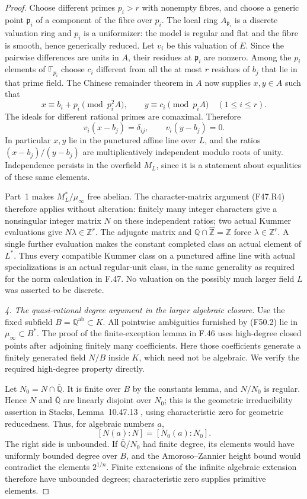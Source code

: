 \begin{proof}
Choose different primes $p_i>r$ with nonempty fibres, and choose
a generic point $\mathfrak p_i$ of a component of the fibre over
$p_i$. The local ring $A_{\mathfrak p_i}$ is a discrete valuation
ring and $p_i$ is a uniformizer: the model is regular and flat and
the fibre is smooth, hence generically reduced. Let $v_i$ be this
valuation of $E$. Since the pairwise differences are units in
$A$, their residues at $\mathfrak p_i$ are nonzero. Among the
$p_i$ elements of $\mathbb F_{p_i}$ choose $c_i$ different from
all the at most $r$ residues of $b_j$ that lie in that prime field.
The Chinese remainder theorem in $A$ now supplies $x,y\in A$
such that
\[
 x\equiv b_i+p_i\pmod{p_i^2A},\qquad
 y\equiv c_i\pmod{p_iA}\quad(1\le i\le r).
\]
The ideals for different rational primes are comaximal. Therefore
\[
 v_i(x-b_j)=\delta_{ij},\qquad v_i(y-b_j)=0.                \tag{F50.4}
\]
In particular $x,y$ lie in the punctured affine line over $L$,
and the ratios $(x-b_j)/(y-b_j)$ are multiplicatively independent
modulo roots of unity. Independence persists in the overfield
$M_L$, since it is a statement about equalities of these same
elements.

Part~1 makes $M_L^*/\mu_\infty$ free abelian. The character-matrix
argument (F47.R4) therefore applies without alteration: finitely
many integer characters give a nonsingular integer matrix $N$ on
these independent ratios; two actual Kummer evaluations give
$N\lambda\in\mathbb Z^r$. The adjugate matrix and
$\mathbb Q\cap\widehat{\mathbb Z}=\mathbb Z$ force
$\lambda\in\mathbb Z^r$. A single further evaluation makes the
constant completed class an actual element of $L^*$.
Thus every compatible Kummer class on a punctured affine line
with actual specializations is an actual regular-unit class, in
the same generality as required for the norm calculation in F.47.
No valuation on the possibly much larger field $L$ was asserted
to be discrete.

\emph{4. The quasi-rational degree argument in the larger algebraic closure.}
Use the fixed subfield $B=\mathbb Q^{\mathrm{ab}}\subset K$.
All pointwise ambiguities furnished by (F50.2) lie in
$\mu_\infty\subset B^*$. The proof of the finite-exception lemma
in F.46 uses high-degree closed points after adjoining finitely
many coefficients. Here those coefficients generate a finitely
generated field $N/B$ inside $K$, which need not be algebraic.
We verify the required high-degree property directly.

Let $N_0=N\cap\overline{\mathbb Q}$. It is finite over $B$ by
the constants lemma, and $N/N_0$ is regular. Hence $N$ and
$\overline{\mathbb Q}$ are linearly disjoint over $N_0$; this is
the geometric irreducibility assertion in Stacks,
Lemma~10.47.13 \cite{StacksFGConstants}, using characteristic zero
for geometric reducedness. Thus, for algebraic numbers $a$,
\[
          [N(a):N]=[N_0(a):N_0].                           \tag{F50.5}
\]
The right side is unbounded. If
$\overline{\mathbb Q}/N_0$ had finite degree, its elements would
have uniformly bounded degree over $B$, and the Amoroso--Zannier
height bound would contradict the elements $2^{1/n}$.
Finite extensions of the infinite algebraic extension therefore
have unbounded degrees; characteristic zero supplies primitive
elements.


\end{proof}
